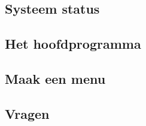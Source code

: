 \documentclass[a4paper,12pt,twoside,openright,titlepage]{article}
\begin{document}
\subsection{Systeem status}


\subsection{Het hoofdprogramma}


\subsection{Maak een menu}


\subsection{Vragen}


\printindex
\end{document}
